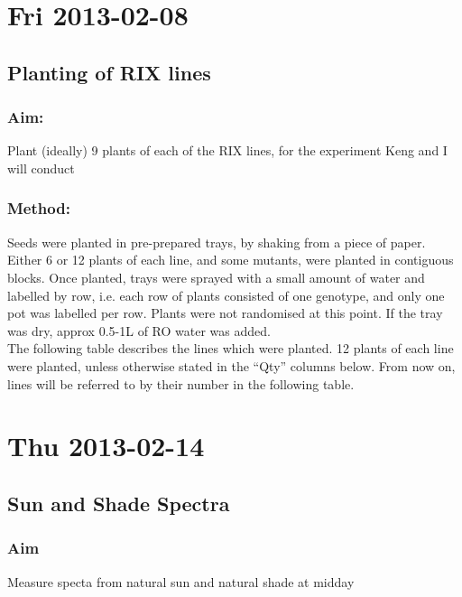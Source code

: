 \documentclass[12pt,a4paper]{book}
\begin{document}
\chapter*{Fri 2013-02-08}
  \section*{Planting of RIX lines}
    \subsection*{Aim:}
      Plant (ideally) 9 plants of each of the RIX lines, for the experiment Keng and I will
      conduct
    \subsection*{Method:}
      Seeds were planted in pre-prepared trays, by shaking from a piece of paper. Either 6 or 12
      plants of each line, and some mutants, were planted in contiguous blocks. Once planted, trays
      were sprayed with a small amount of water and labelled by row, i.e. each row of plants
      consisted of one genotype, and only one pot was labelled per row. Plants were not randomised at
      this point. If the tray was dry, approx 0.5-1L of RO water was added.\\
      The following table describes the lines which were planted. 12 plants of each line were
      planted, unless otherwise stated in the ``Qty'' columns below. From now on, lines will be
      referred to by their number in the following table. \label{20130208-linestable}

\chapter*{Thu 2013-02-14}
  \section*{Sun and Shade Spectra}
    \subsection*{Aim}
      Measure specta from natural sun and natural shade at midday
\end{document}
